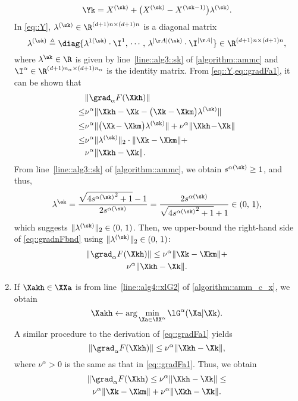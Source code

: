 \begin{enumerate}[leftmargin=0.45cm]
\begin{equation}
	\Yk = X^{(\sk)}+\big(X^{(\sk)}-X^{(\sk-1)}\big) \lambda^{(\sk)}.
\end{equation}
In \cref{eq::Y}, $\lambda^{(\sk)}\in\R^{(d+1)n\times(d+1)n}$ is a diagonal matrix
\begin{equation} 
	\nonumber
	\lambda^{(\sk)}\triangleq\diag\{\lambda^{1(\sk)}\cdot\I^1,\,\cdots,\,\lambda^{|\AA|(\sk)}\cdot\I^{|\AA|}\}\in \R^{(d+1)n\times(d+1)n},
\end{equation}
where $\lambda^{\ak}\in\R$ is given by line~\ref{line::alg3::sk} of \cref{algorithm::ammc} and $\I^\alpha\in \R^{(d+1)n_\alpha\times (d+1)n_\alpha}$ is the identity matrix. From \cref{eq::Y,eq::gradFa1}, it can be shown that
\begin{equation}\label{eq::gradnFbnd}
\begin{aligned}
	&\|\grad_\alpha F(\Xkh)\|\\
\leq&\nu^\alpha \|\Xkh-\Xk-\big(\Xk-\Xkm\big) \lambda^{(\sk)}\|\\
\leq&\nu^\alpha\|\big(\Xk\!-\Xkm\big) \lambda^{(\sk)}\|+\nu^\alpha \|\Xkh\!-\!\Xk\|\\
\leq&\nu^\alpha\|\lambda^{(\sk)}\|_2\cdot\|\Xk-\Xkm\|+\\
	&\nu^\alpha \|\Xkh-\Xk\|.
\end{aligned}
\end{equation} 
From line~\ref{line::alg3::sk} of \cref{algorithm::ammc}, we obtain $s^{\alpha(\sk)}\geq1$, and thus,
\begin{equation}
	\nonumber
	\lambda^{\ak}=\frac{\sqrt{4{s^{\alpha(\sk)}}^2+1}-1}{2s^{\alpha(\sk)}}=\frac{2s^{\alpha(\sk)}}{\sqrt{4{s^{\alpha(\sk)}}^2+1}+1}\in(0,\,1),
\end{equation}
which suggests $\|\lambda^{(\sk)}\|_2\in(0,\,1)$. Then, we upper-bound the right-hand side of \cref{eq::gradnFbnd} using $\|\lambda^{(\sk)}\|_2\in(0,\,1)$:
\begin{multline}\label{eq::gradanFF1}
	\|\grad_{\alpha} F(\Xkh)\|\leq \nu^\alpha\|\Xk-\Xkm\|+\\\nu^\alpha\|\Xkh-\Xk\|.
\end{multline}
\item If $\Xakh\in\XXa$ is from line~\ref{line::alg4::xlG2} of \cref{algorithm::amm_c_x}, we obtain
\begin{equation}\label{eq::minH2}
	\Xakh\gets\arg\min\limits_{\Xa\in\XX^\alpha }\lG^\alpha(\Xa|\Xk).
\end{equation}
A similar procedure to the derivation of \cref{eq::gradFa1} yields
\begin{equation}
	\nonumber
	\|\grad_{\alpha} F(\Xkh)\|\leq \nu^\alpha \|\Xkh-\Xk\|,
\end{equation}
where $\nu^\alpha>0$ is the same as that in \cref{eq::gradFa1}. Thus, we obtain
\begin{multline}\label{eq::gradanFF2}
	\|\grad_{\alpha} F(\Xkh)\leq \nu^\alpha\|\Xkh-\Xk\|\leq
	\\  \nu^\alpha\|\Xk-\Xkm\|+\nu^\alpha\|\Xkh-\Xk\|.
\end{multline}
\end{enumerate}
